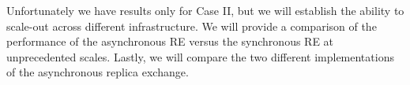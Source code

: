 \documentclass[a4paper,10pt]{article}
\newcommand{\jhanote}[1]{ {\textcolor{red} { ***shantenu: #1 }}}
\newcommand{\athotanote}[1]{ {\textcolor{green} { ***athota: #1 }}}
\newcommand{\jhanote}[1]{}
\newcommand{\athotanote}[1]{}
\begin{document}
Unfortunately we have results only for Case II, but we will establish the ability to scale-out across different infrastructure. We will provide a comparison of the performance of the asynchronous RE versus the synchronous RE at unprecedented scales. Lastly, we will compare the two different implementations of the asynchronous replica exchange.


 
  
 
\end{document}
